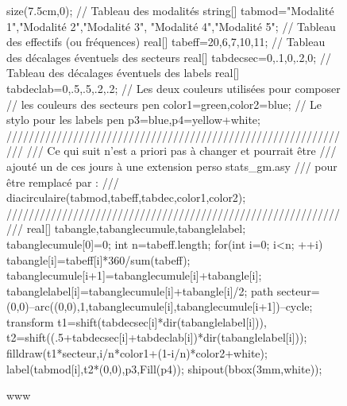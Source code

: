 \documentclass[a4paper]{book}
\begin{document}
\begin{figure}[!ht]
	\centering
	\begin{asy}
	size(7.5cm,0);
// Tableau des modalités
string[] tabmod={"Modalit\'e 1","Modalit\'e 2","Modalit\'e 3",
                 "Modalit\'e 4","Modalit\'e 5"};
// Tableau des effectifs (ou fréquences)
real[] tabeff={20,6,7,10,11};
// Tableau des décalages éventuels des secteurs
real[] tabdecsec={0,.1,0,.2,0};
// Tableau des décalages éventuels des labels
real[] tabdeclab={0,.5,.5,.2,.2};
// Les deux couleurs utilisées pour composer
// les couleurs des secteurs
pen color1=green,color2=blue;
// Le stylo pour les labels
pen p3=blue,p4=yellow+white;
///////////////////////////////////////////////////////////////
/// Ce qui suit n'est a priori pas à changer et pourrait être
/// ajouté un de ces jours à une extension perso stats_gm.asy
/// pour être remplacé par :
/// diacirculaire(tabmod,tabeff,tabdec,color1,color2);
///////////////////////////////////////////////////////////////
real[] tabangle,tabanglecumule,tabanglelabel;
tabanglecumule[0]=0;
int n=tabeff.length;
for(int i=0; i<n; ++i) {
  tabangle[i]=tabeff[i]*360/sum(tabeff);
  tabanglecumule[i+1]=tabanglecumule[i]+tabangle[i];
  tabanglelabel[i]=tabanglecumule[i]+tabangle[i]/2;
  path secteur=(0,0)--arc((0,0),1,tabanglecumule[i],tabanglecumule[i+1])--cycle;
  transform t1=shift(tabdecsec[i]*dir(tabanglelabel[i])),
            t2=shift((.5+tabdecsec[i]+tabdeclab[i])*dir(tabanglelabel[i]));
  filldraw(t1*secteur,i/n*color1+(1-i/n)*color2+white);
  label(tabmod[i],t2*(0,0),p3,Fill(p4));
}
shipout(bbox(3mm,white));
	\end{asy}
	\caption{www}
\end{figure}
\end{document}
